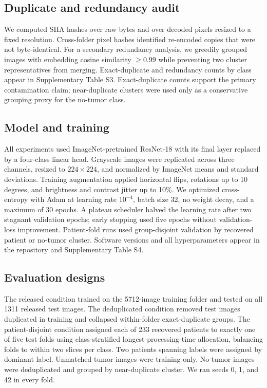 ﻿\documentclass[twocolumn]{article}
\begin{document}
\subsection{Duplicate and redundancy audit}
We computed SHA hashes over raw bytes and over decoded pixels resized to a fixed resolution. Cross-folder pixel hashes identified re-encoded copies that were not byte-identical. For a secondary redundancy analysis, we greedily grouped images with embedding cosine similarity $\geq0.99$ while preventing two cluster representatives from merging. Exact-duplicate and redundancy counts by class appear in Supplementary Table S3. Exact-duplicate counts support the primary contamination claim; near-duplicate clusters were used only as a conservative grouping proxy for the no-tumor class.

\subsection{Model and training}
All experiments used ImageNet-pretrained ResNet-18\cite{he2016deep} with its final layer replaced by a four-class linear head. Grayscale images were replicated across three channels, resized to $224\times224$, and normalized by ImageNet means and standard deviations. Training augmentation applied horizontal flips, rotations up to 10 degrees, and brightness and contrast jitter up to 10\%. We optimized cross-entropy with Adam at learning rate $10^{-4}$, batch size 32, no weight decay, and a maximum of 30 epochs. A plateau scheduler halved the learning rate after two stagnant validation epochs; early stopping used five epochs without validation-loss improvement. Patient-fold runs used group-disjoint validation by recovered patient or no-tumor cluster. Software versions and all hyperparameters appear in the repository and Supplementary Table S4.

\subsection{Evaluation designs}
The released condition trained on the 5712-image training folder and tested on all 1311 released test images. The deduplicated condition removed test images duplicated in training and collapsed within-folder exact-duplicate groups. The patient-disjoint condition assigned each of 233 recovered patients to exactly one of five test folds using class-stratified longest-processing-time allocation, balancing folds to within two slices per class. Two patients spanning labels were assigned by dominant label. Unmatched tumor images were training-only. No-tumor images were deduplicated and grouped by near-duplicate cluster. We ran seeds 0, 1, and 42 in every fold.
\end{document}
